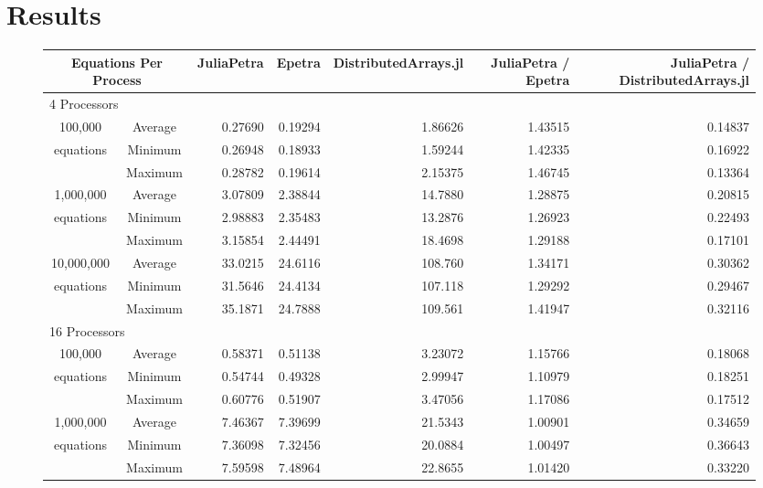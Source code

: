 \documentclass[acmsmall]{acmart}
\begin{document}
\section{Results}

\begin{figure}[h]
\begin{tabular}{|c c|r|r|r||r|r|}
	\hline
		\multicolumn{2}{|c|}{Equations Per Process}
		& JuliaPetra
		& Epetra
		& \multicolumn{1}{m{1.8cm}||}{Distributed\-Arrays.jl}
		& \multicolumn{1}{m{1.75cm}|}{JuliaPetra / Epetra}
		& \multicolumn{1}{m{1.8cm}|}{JuliaPetra / Distributed\-Arrays.jl} \\
	\hline
		\multicolumn{7}{|l|}{4 Processors}\\
	\hline
		100,000			&Average & 0.27690 & 0.19294 & 1.86626 & 1.43515 & 0.14837 \\
		equations		&Minimum & 0.26948 & 0.18933 & 1.59244 & 1.42335 & 0.16922 \\
						&Maximum & 0.28782 & 0.19614 & 2.15375 & 1.46745 & 0.13364 \\
	\hline
		1,000,000		&Average & 3.07809 & 2.38844 & 14.7880 & 1.28875 & 0.20815 \\
		equations		&Minimum & 2.98883 & 2.35483 & 13.2876 & 1.26923 & 0.22493 \\
						&Maximum & 3.15854 & 2.44491 & 18.4698 & 1.29188 & 0.17101 \\
	\hline
		10,000,000		&Average & 33.0215 & 24.6116 & 108.760 & 1.34171 & 0.30362 \\
		equations		&Minimum & 31.5646 & 24.4134 & 107.118 & 1.29292 & 0.29467 \\
						&Maximum & 35.1871 & 24.7888 & 109.561 & 1.41947 & 0.32116 \\
	\hline
		\multicolumn{7}{|l|}{16 Processors}\\
	\hline
		100,000			&Average & 0.58371 & 0.51138 & 3.23072 & 1.15766 & 0.18068 \\
		equations		&Minimum & 0.54744 & 0.49328 & 2.99947 & 1.10979 & 0.18251 \\
						&Maximum & 0.60776 & 0.51907 & 3.47056 & 1.17086 & 0.17512 \\
	\hline
		1,000,000		&Average & 7.46367 & 7.39699 & 21.5343 & 1.00901 & 0.34659 \\
		equations		&Minimum & 7.36098 & 7.32456 & 20.0884 & 1.00497 & 0.36643 \\
						&Maximum & 7.59598 & 7.48964 & 22.8655 & 1.01420 & 0.33220 \\

\end{tabular}
\end{figure}
\end{document}
